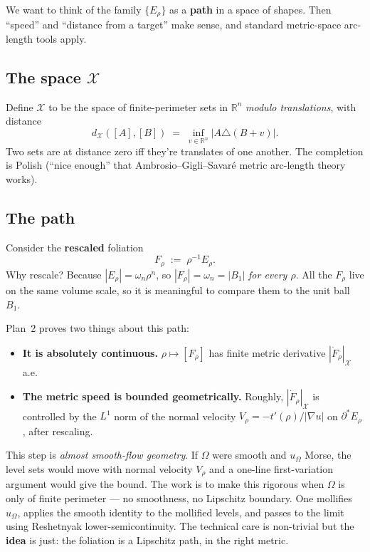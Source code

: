 \documentclass[11pt,a4paper]{article}
\newcommand{\R}{\mathbb{R}}
\newcommand{\X}{\mathcal{X}}
\newcommand{\Erho}{E_\rho}
\newcommand{\Frho}{F_\rho}
\newcommand{\dX}{d_{\X}}
\begin{document}
We want to think of the family $\{\Erho\}$ as a \textbf{path} in a space of shapes. Then ``speed'' and ``distance from a target'' make sense, and standard metric-space arc-length tools apply.

\subsection*{The space $\X$}

Define $\X$ to be the space of finite-perimeter sets in $\R^n$ \emph{modulo translations}, with distance
\[
\dX([A], [B]) \;=\; \inf_{v \in \R^n} |A \triangle (B+v)|.
\]
Two sets are at distance zero iff they're translates of one another. The completion is Polish (``nice enough'' that Ambrosio--Gigli--Savar\'e metric arc-length theory works).

\subsection*{The path}

Consider the \textbf{rescaled} foliation
\[
\Frho \;:=\; \rho^{-1} \Erho.
\]
Why rescale? Because $|\Erho| = \omega_n \rho^n$, so $|\Frho| = \omega_n = |B_1|$ \emph{for every $\rho$}. All the $\Frho$ live on the same volume scale, so it is meaningful to compare them to the unit ball $B_1$.

Plan~2 proves two things about this path:
\begin{itemize}[leftmargin=*]
\item \textbf{It is absolutely continuous.} $\rho \mapsto [\Frho]$ has finite metric derivative $|\dot \Frho|_{\X}$ a.e.
\item \textbf{The metric speed is bounded geometrically.} Roughly, $|\dot \Frho|_{\X}$ is controlled by the $L^1$ norm of the normal velocity $V_\rho = -t'(\rho)/|\nabla u|$ on $\partial^* \Erho$, after rescaling.
\end{itemize}

This step is \emph{almost smooth-flow geometry}. If $\Omega$ were smooth and $u_\Omega$ Morse, the level sets would move with normal velocity $V_\rho$ and a one-line first-variation argument would give the bound. The work is to make this rigorous when $\Omega$ is only of finite perimeter --- no smoothness, no Lipschitz boundary. One mollifies $u_\Omega$, applies the smooth identity to the mollified levels, and passes to the limit using Reshetnyak lower-semicontinuity. The technical care is non-trivial but the \textbf{idea} is just: the foliation is a Lipschitz path, in the right metric.
\end{document}
